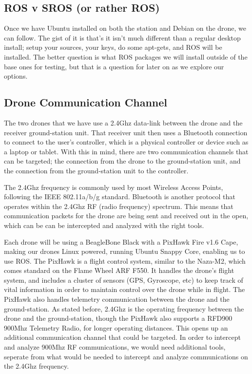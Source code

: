 \documentclass[IEEEtran,letterpaper,10pt,titlepage,draftclsnofoot,onecolumn]{article}
\begin{document}
\subsection*{ROS v SROS (or rather ROS)}
Once we have Ubuntu installed on both the station and Debian on the drone, we can follow\cite{Indigo}.
The gist of it is that's it isn't much different than a regular desktop install; setup your sources, your keys, do some
apt-gets, and ROS will be installed. The better question is what ROS packages we will install outside of the base ones for
testing, but that is a question for later on as we explore our options.

\subsection*{Drone Communication Channel}
The two drones that we have use a 2.4Ghz data-link between the drone and the receiver ground-station unit.
That receiver unit then uses a Bluetooth connection to connect to the user's controller, which is a physical controller
or device such as a laptop or tablet.\cite{NazaM2} With this in mind, there are two communication channels that can be
targeted; the connection from the drone to the ground-station unit, and the connection from the ground-station unit
to the controller\cite{NazaM2}.

The 2.4Ghz frequency is commonly used by most Wireless Access Points, following the IEEE 802.11a/b/g
standard. Bluetooth is another protocol that operates within the 2.4Ghz RF (radio frequency)
spectrum\cite{HakDaSpectrum}. This means that communication packets for the drone are being sent and received out in the
open, which can be can be intercepted and analyzed with the right tools.

Each drone will be using a BeagleBone Black with a PixHawk Fire v1.6 Cape, making our drones Linux powered, running
Ubuntu Snappy Core, enabling us to use ROS\cite{PixHawk}. The PixHawk is a flight control system, similar to the
Naza-M2, which comes standard on the Flame Wheel ARF F550. It handles the drone's flight system, and includes a cluster
of sensors (GPS, Gyroscope, etc) to keep track of vital information in order to maintain control over the drone while
in flight. The PixHawk also handles telemetry communication between the drone and the ground-station. As stated before,
2.4Ghz is the operating frequency between the drone and the ground-station, though the PixHawk also supports a RFD900
900Mhz Telemetry Radio, for longer operating distances\cite{PixHawkDocs}. This opens up an additional communication
channel that could be targeted. In order to intercept and analyze 900Mhz RF communications, we would need additional
tools, seperate from what would be needed to intercept and analyze communications on the 2.4Ghz
frequency\cite{HakDaSpectrum900}.
\end{document}

